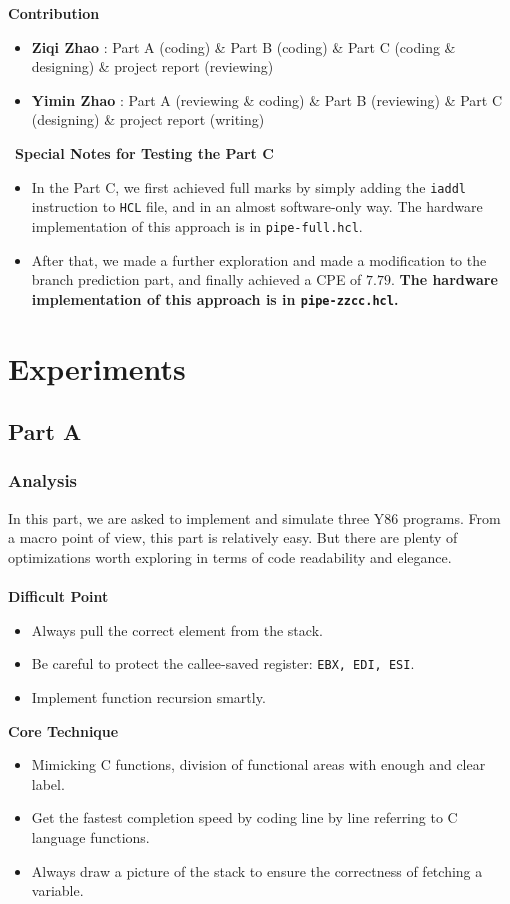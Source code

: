 \documentclass[12pt,a4paper]{article}
\begin{document}
\textbf{Contribution}
\begin{itemize}
	\item \textbf{Ziqi Zhao} : Part A (coding) \& Part B (coding) \& Part C (coding \& designing) \& project report (reviewing)
	\item \textbf{Yimin Zhao} : Part A (reviewing \& coding) \& Part B (reviewing) \& Part C (designing) \& project report (writing)
\end{itemize}
\
\textbf{Special Notes for Testing the Part C}
\begin{itemize}
	\item In the Part C, we first achieved full marks by simply adding the \texttt{iaddl} instruction to \texttt{HCL} file, and in an almost software-only way. The hardware implementation of this approach is in \texttt{pipe-full.hcl}.
	\item After that, we made a further exploration and made a modification to the branch prediction part, and finally achieved a CPE of $7.79$. {\color{blue}\textbf{The hardware implementation of this approach is in \texttt{pipe-zzcc.hcl}.}}
\end{itemize}
\pagebreak
\section{Experiments}
\subsection{Part A}
\subsubsection{Analysis}
In this part, we are asked to implement and simulate three Y86 programs. 
From a macro point of view, this part is relatively easy. 
But there are plenty of optimizations worth exploring in terms of code readability and elegance.\\\\
\textbf{Difficult Point} 
\begin{itemize}
        \item Always pull the correct element from the stack.
        \item Be careful to protect the callee-saved register: \texttt{EBX, EDI, ESI}.
        \item Implement function recursion smartly.
\end{itemize}
\textbf{Core Technique}
\begin{itemize}
        \item Mimicking C functions, division of functional areas with enough and clear label.
        \item Get the fastest completion speed by coding line by line referring to C language functions.
        \item Always draw a picture of the stack to ensure the correctness of fetching a variable.
\end{itemize}
\end{document}
